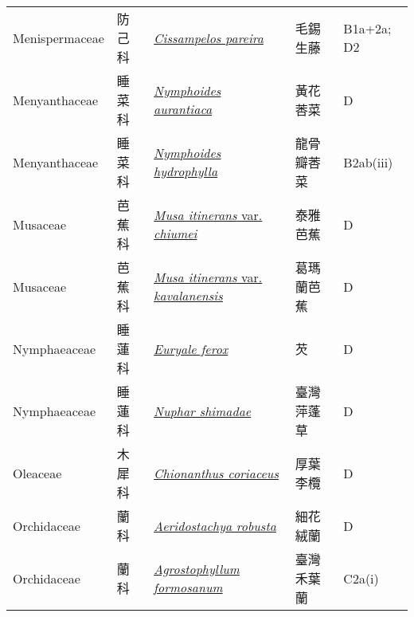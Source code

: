 {\begin{longtable}{p{2.5cm}p{2.5cm}p{4.5cm}p{2.5cm}p{3cm}}
    Menispermaceae & 防己科 & \href{http://www.theplantlist.org/tpl1.1/search?q=Cissampelos+pareira}{\textit{Cissampelos pareira} } & 毛錫生藤 & B1a+2a; D2 \index{Cissampelos@\textit{Cissampelos}!pareira@\textit{pareira}}  \index{毛錫生藤} \\
    Menyanthaceae & 睡菜科 & \href{http://www.theplantlist.org/tpl1.1/search?q=Nymphoides+aurantiaca}{\textit{Nymphoides aurantiaca} } & 黃花莕菜 & D \index{Nymphoides@\textit{Nymphoides}!aurantiaca@\textit{aurantiaca}}  \index{黃花莕菜} \\
    Menyanthaceae & 睡菜科 & \href{http://www.theplantlist.org/tpl1.1/search?q=Nymphoides+hydrophylla}{\textit{Nymphoides hydrophylla} } & 龍骨瓣莕菜 & B2ab(iii) \index{Nymphoides@\textit{Nymphoides}!hydrophylla@\textit{hydrophylla}}  \index{龍骨瓣莕菜} \\
    Musaceae & 芭蕉科 & \href{http://www.theplantlist.org/tpl1.1/search?q=Musa+itinerans+var.+chiumei}{\textit{Musa itinerans} var. \textit{chiumei} } & 泰雅芭蕉 & D \index{Musa@\textit{Musa}!itinerans@\textit{itinerans}!var. chiumei@var. \textit{chiumei}}  \index{泰雅芭蕉} \\
    Musaceae & 芭蕉科 & \href{http://www.theplantlist.org/tpl1.1/search?q=Musa+itinerans+var.+kavalanensis}{\textit{Musa itinerans} var. \textit{kavalanensis} } & 葛瑪蘭芭蕉 & D \index{Musa@\textit{Musa}!itinerans@\textit{itinerans}!var. kavalanensis@var. \textit{kavalanensis}}  \index{葛瑪蘭芭蕉} \\
    Nymphaeaceae & 睡蓮科 & \href{http://www.theplantlist.org/tpl1.1/search?q=Euryale+ferox}{\textit{Euryale ferox} } & 芡 & D \index{Euryale@\textit{Euryale}!ferox@\textit{ferox}}  \index{芡} \\
    Nymphaeaceae & 睡蓮科 & \href{http://www.theplantlist.org/tpl1.1/search?q=Nuphar+shimadae}{\textit{Nuphar shimadae} } & 臺灣萍蓬草 & D \index{Nuphar@\textit{Nuphar}!shimadae@\textit{shimadae}}  \index{臺灣萍蓬草} \\
    Oleaceae & 木犀科 & \href{http://www.theplantlist.org/tpl1.1/search?q=Chionanthus+coriaceus}{\textit{Chionanthus coriaceus} } & 厚葉李欖 & D \index{Chionanthus@\textit{Chionanthus}!coriaceus@\textit{coriaceus}}  \index{厚葉李欖} \\
    Orchidaceae & 蘭科 & \href{http://www.theplantlist.org/tpl1.1/search?q=Aeridostachya+robusta}{\textit{Aeridostachya robusta} } & 細花絨蘭 & D \index{Aeridostachya@\textit{Aeridostachya}!robusta@\textit{robusta}}  \index{細花絨蘭} \\
    Orchidaceae & 蘭科 & \href{http://www.theplantlist.org/tpl1.1/search?q=Agrostophyllum+formosanum}{\textit{Agrostophyllum formosanum} } & 臺灣禾葉蘭 & C2a(i) \index{Agrostophyllum@\textit{Agrostophyllum}!formosanum@\textit{formosanum}}  \index{臺灣禾葉蘭} \\

\end{longtable}}
